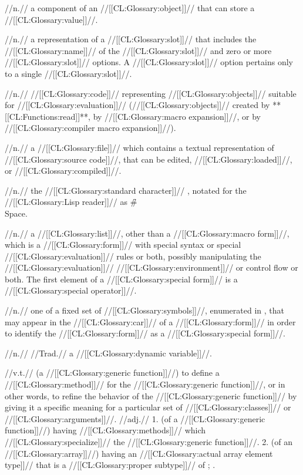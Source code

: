  //n.// a component of an //[[CL:Glossary:object]]// that can store a //[[CL:Glossary:value]]//.


 //n.// a representation of a //[[CL:Glossary:slot]]// that includes the //[[CL:Glossary:name]]// of the //[[CL:Glossary:slot]]// and zero or more //[[CL:Glossary:slot]]// options. A //[[CL:Glossary:slot]]// option pertains only to a single //[[CL:Glossary:slot]]//.

 //n.// //[[CL:Glossary:code]]// representing //[[CL:Glossary:objects]]// suitable for //[[CL:Glossary:evaluation]]// (\eg //[[CL:Glossary:objects]]// created by **[[CL:Functions:read]]**, by //[[CL:Glossary:macro expansion]]//, 
 or by //[[CL:Glossary:compiler macro expansion]]//).

 //n.// a //[[CL:Glossary:file]]// which contains a textual representation of //[[CL:Glossary:source code]]//, that can be edited, //[[CL:Glossary:loaded]]//, or //[[CL:Glossary:compiled]]//.

 //n.// the //[[CL:Glossary:standard character]]// \SpaceChar, notated for the //[[CL:Glossary:Lisp reader]]// as \f{\#\\Space}.

 //n.// a //[[CL:Glossary:list]]//, other than a //[[CL:Glossary:macro form]]//, which is a //[[CL:Glossary:form]]// with special syntax or special //[[CL:Glossary:evaluation]]// rules or both, possibly manipulating the //[[CL:Glossary:evaluation]]// //[[CL:Glossary:environment]]// or control flow or both. The first element of a //[[CL:Glossary:special form]]// is a //[[CL:Glossary:special operator]]//.

 //n.// one of a fixed set of //[[CL:Glossary:symbols]]//, enumerated in \figref\CLSpecialOps, that may appear in the //[[CL:Glossary:car]]// of a //[[CL:Glossary:form]]// in order to identify the //[[CL:Glossary:form]]// as a //[[CL:Glossary:special form]]//.

 //n.// //Trad.// a //[[CL:Glossary:dynamic variable]]//.

 //v.t.// (a //[[CL:Glossary:generic function]]//) to define a //[[CL:Glossary:method]]// for the //[[CL:Glossary:generic function]]//, or in other words, to refine the behavior of the //[[CL:Glossary:generic function]]// by giving it a specific meaning for a particular set of //[[CL:Glossary:classes]]// or //[[CL:Glossary:arguments]]//. 
 //adj.// 1. (of a //[[CL:Glossary:generic function]]//) having //[[CL:Glossary:methods]]// which //[[CL:Glossary:specialize]]// the //[[CL:Glossary:generic function]]//. 2. (of an //[[CL:Glossary:array]]//) having an //[[CL:Glossary:actual array element type]]// that is a //[[CL:Glossary:proper subtype]]// of ; \seesection\ArrayElements. 

